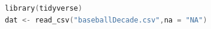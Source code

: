 \begin{lstlisting}[language=c++,label={code:05_09},caption={Reading CSV file}]
library(tidyverse)
dat <- read_csv("baseballDecade.csv",na = "NA")
\end{lstlisting}
